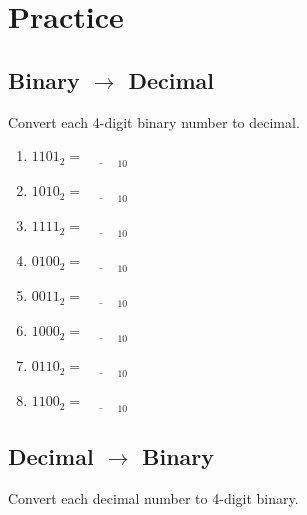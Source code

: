 \documentclass{article}
\begin{document}
\section*{Practice}
\begin{multicols}{2}

\subsection*{Binary $\rightarrow$ Decimal}
Convert each 4-digit binary number to decimal.
\vspace{0.5cm}

\begin{enumerate}[label=\arabic*.,itemsep=1cm]
    \item $1101_2 = \underline{\hspace{1cm}}_{10}$
    \item $1010_2 = \underline{\hspace{1cm}}_{10}$
    \item $1111_2 = \underline{\hspace{1cm}}_{10}$
    \item $0100_2 = \underline{\hspace{1cm}}_{10}$
    \item $0011_2 = \underline{\hspace{1cm}}_{10}$
    \item $1000_2 = \underline{\hspace{1cm}}_{10}$
    \item $0110_2 = \underline{\hspace{1cm}}_{10}$
    \item $1100_2 = \underline{\hspace{1cm}}_{10}$
\end{enumerate}

\subsection*{Decimal $\rightarrow$ Binary}
Convert each decimal number to 4-digit binary.
\vspace{0.5cm}


\end{multicols}
\end{document}
